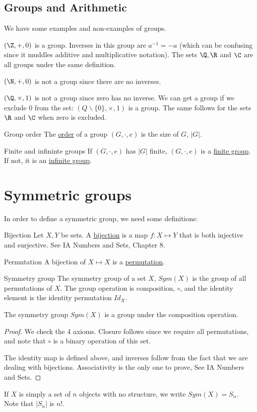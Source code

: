 \documentclass[../Main.tex]{subfiles}
\begin{document}
\subsection{Groups and Arithmetic}
We have some examples and non-examples of groups.\par
$(\Z, +, 0)$ is a group. Inverses in this group are $a^{-1} = - a$ (which can be confusing since it muddles additive and multiplicative notation). The sets $\Q, \R$ and $\C$ are all groups under the same definition.\par
$(\N, +, 0)$ is not a group since there are no inverses.\par
$(\Q, \times, 1)$ is not a group since zero has no inverse. We can get a group if we exclude $0$ from the set: $(Q \backslash \{0\}, \times, 1)$ is a group. The same follows for the sets $\R$ and $\C$ when zero is excluded.
\begin{definition}{Group order}
    The \underline{order} of a group $(G, \cdot, e)$ is the size of $G$, $|G|$.
\end{definition}
\begin{definition}{Finite and infininte groups}
    If $(G, \cdot, e)$ has $|G|$ finite, $(G, \cdot, e)$ is a \underline{finite group}. If not, it is an \underline{infinite group}.
\end{definition}
\section{Symmetric groups}
In order to define a symmetric group, we need some definitions:
\begin{definition}{Bijection}
    Let $X, Y$ be sets. A \underline{bijection} is a map $f : X \mapsto Y$ that is both injective and surjective. See IA Numbers and Sets, Chapter 8.
\end{definition}
\begin{definition}{Permutation}
    A bijection of $X \mapsto X$ is a \underline{permutation}.
\end{definition}
\begin{definition}{Symmetry group}
    The symmetry group of a set $X$, $Sym(X)$ is the group of all permutations of $X$. The group operation is composition, $\circ$, and the identity element is the identity permutation $Id_X$.
\end{definition}
\begin{lemma}
    The symmetry group $Sym(X)$ is a group under the composition operation.
\end{lemma}
\begin{proof}
    We check the 4 axioms. Closure follows since we require all permutations, and note that $\circ$ is a binary operation of this set.\par
    The identity map is defined above, and inverses follow from the fact that we are dealing with bijections. Associativity is the only one to prove, See IA Numbers and Sets.
\end{proof}
If $X$ is simply a set of $n$ objects with no structure, we write $Sym(X) = S_n$. Note that $|S_n|$ is $n!$.
\end{document}
